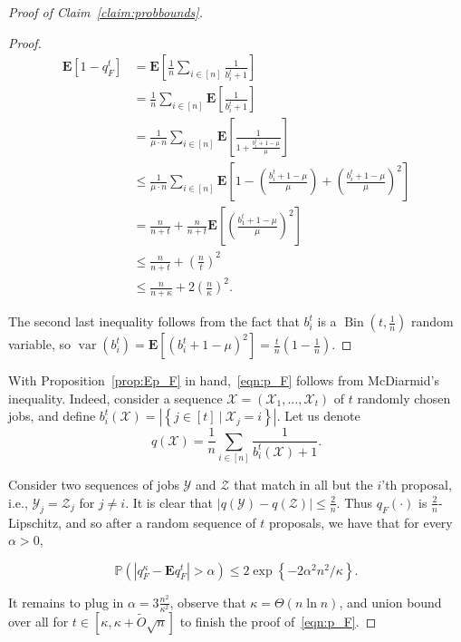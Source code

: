 \documentclass[11pt]{amsart}
\begin{document}
\begin{proof}[Proof of Claim~\ref{claim:probbounds}]
\begin{proof}
\begin{align*}
\mathbf{E}[1-q_F^t] & = \mathbf{E}\left[\frac{1}{n}\sum_{i\in [n]}\frac{1}{b_i^t+1}\right] \\
& = \frac{1}{n}\sum_{i \in [n]}\mathbf{E}\left[\frac{1}{b_i^t + 1}\right] \\
& = \frac{1}{\mu\cdot n}\sum_{i \in [n]}\mathbf{E}\left[\frac{1}{1 + \frac{b_i^t + 1 - \mu}{\mu}}\right]\\
& \leq \frac{1}{\mu \cdot n}\sum_{i\in [n]}\mathbf{E}\left[1 - \left(\frac{b_i^t + 1 - \mu}{\mu}\right) + \left(\frac{b_i^t + 1 - \mu}{\mu}\right)^2\right] \\
& = \frac{n}{n+t} + \frac{n}{n+t}\mathbf{E}\left[\left(\frac{b_1^t + 1 - \mu}{\mu}\right)^2\right] \\
& \leq \frac{n}{n + t} + \left(\frac{n}{t}\right)^2\\
& \leq \frac{n}{n+\kappa} + 2\left(\frac{n}{\kappa}\right)^2.
\end{align*}

The second last inequality follows from the fact that $b_i^t$ is a $\operatorname{Bin}\left(t,\frac{1}{n}\right)$ random variable, so $\operatorname{var}(b_i^t) = \mathbf{E}\left[(b_i^t + 1 - \mu)^2\right] = \frac{t}{n}\left(1 - \frac{1}{n}\right)$.
\end{proof}


With Proposition~\ref{prop:Ep_F} in hand,~\eqref{eqn:p_F} follows from McDiarmid's inequality. Indeed, consider a sequence $\mathcal{X} = (\mathcal{X}_1,\ldots, \mathcal{X}_{t})$ of $t$ randomly chosen jobs, and define $b_i^t(\mathcal{X}) = |\left\{j\in [t]~|~\mathcal{X}_j = i\right\}|$. Let us denote 
\[
q(\mathcal{X}) = \frac{1}{n}\sum_{i \in [n]}\frac{1}{b_i^t(\mathcal{X}) + 1}.
\]

Consider two sequences of jobs $\mathcal{Y}$ and $\mathcal{Z}$ that match in all but the $i$'th proposal, i.e., $\mathcal{Y}_j = \mathcal{Z}_j$ for $j \neq i$. It is clear that $|q(\mathcal{Y}) - q(\mathcal{Z})| \leq \frac{2}{n}$. Thus $q_F(\cdot)$ is $\frac{2}{n}$-Lipschitz, and so after a random sequence of $t$ proposals, we have that for every $\alpha >0$,



\[
\mathbb{P}\left(|q_F^{\kappa} - \mathbf{E}q_F^{t}| > \alpha\right) \leq 2\exp\left\{-2\alpha^2 n^2/\kappa\right\}.
\]

It remains to plug in $\alpha = 3\frac{n^2}{\kappa^2}$, observe that $\kappa = \Theta(n \ln n)$, and union bound over all for $t \in [\kappa, \kappa + \tilde{O}{\sqrt{n}}]$ to finish the proof of~\eqref{eqn:p_F}. 


\end{proof}
\end{document}
